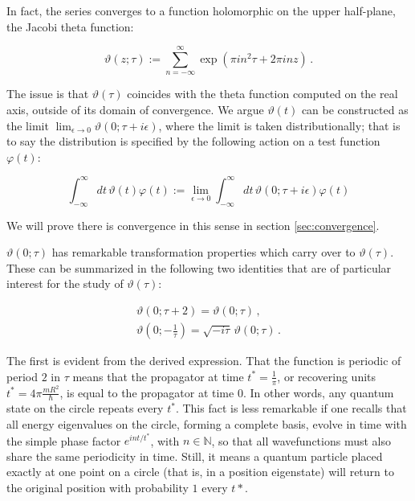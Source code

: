 \documentclass{article}
\newcommand{\T}{\ensuremath{\vartheta}}
\newcommand{\intR}{\int_{-\infty}^\infty}
\newcommand{\sumZ}{\sum_{n=-\infty}^{\infty}}
\begin{document}
In fact, the series converges to a function holomorphic on the upper half-plane, the Jacobi theta function:

\begin{equation}
\vartheta(z;\tau) := \sumZ \exp( \pi i n^2 \tau + 2\pi i n z )\,.
\end{equation}

The issue is that $\T(\tau)$ coincides with the theta function computed on the real axis, outside of its domain of convergence. We argue $\T(t)$ can be constructed as the limit $\lim_{\epsilon\rightarrow 0} \vartheta(0;\tau + i\epsilon)$, where the limit is taken distributionally; that is to say the distribution is specified by the following action on a test function $\varphi(t)$:

\begin{equation}
    \intR dt \, \T(t) \varphi(t)  := \lim_{\epsilon\rightarrow 0} \intR dt \, \vartheta(0; \tau + i \epsilon) \varphi(t)
\end{equation}

We will prove there is convergence in this sense in section \ref{sec:convergence}.

$\vartheta(0;\tau)$ has remarkable transformation properties which carry over to $\T(\tau)$. These can be summarized in the following two identities that are of particular interest for the study of $\T(\tau)$:

\begin{align}
    \vartheta(0; \tau + 2) = \vartheta(0; \tau)\,, \label{t2map}\\
    \vartheta(0; -\tfrac{1}{\tau}) = \sqrt{-i\tau} \, \vartheta(0; \tau)\,. \label{smap}
\end{align}

The first is evident from the derived expression. That the function is periodic of period $2$ in $\tau$ means that the propagator at time $t^* = \frac{1}{\pi}$, or recovering units $t^* = 4\pi \frac{mR^2}{\hbar}$, is equal to the propagator at time $0$. In other words, any quantum state on the circle repeats every $t^*$. This fact is less remarkable if one recalls that all energy eigenvalues on the circle, forming a complete basis, evolve in time with the simple phase factor $e^{int/t^*}$, with $n\in \mathbb{N}$, so that all wavefunctions must also share the same periodicity in time. Still, it means a quantum particle placed exactly at one point on a circle (that is, in a position eigenstate) will return to the original position with probability $1$ every $t*$.

\newcommand{\modg}{PSL(2,\mathbb{Z})}
\end{document}
